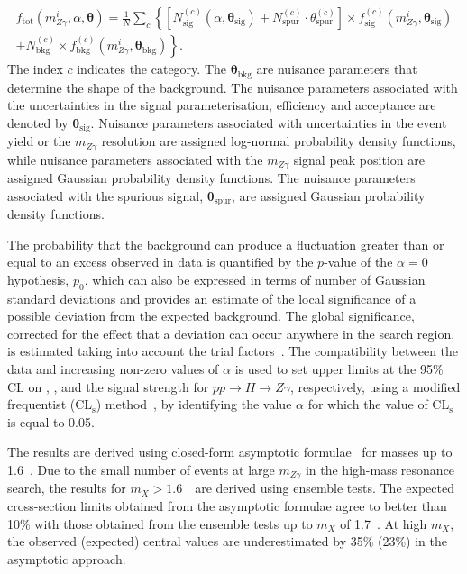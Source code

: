 \begin{multline}
f_\mathrm{tot}(m_{Z\gamma}^i,\alpha,\boldsymbol{\theta}) =
\frac{1}{N} \sum_{c} \left\{ \left[ N_{\mathrm{sig}}^{(c)}(\alpha, \boldsymbol{\theta_\mathrm{sig}}) + N_{\mathrm{spur}}^{(c)} \cdot \theta_{\mathrm{spur}}^{(c)} \right] \times f_{\mathrm{sig}}^{(c)}(m_{Z\gamma}^i,\boldsymbol{\theta_\mathrm{sig}}) \right. \\
\left.  + N_{\mathrm{bkg}}^{(c)} \times f_{\mathrm{bkg}}^{(c)}(m_{Z\gamma}^i,\boldsymbol{\theta_\mathrm{bkg}})\right\}.
\end{multline}
%
The index $c$ indicates the category. The $\boldsymbol{\theta_\mathrm{bkg}}$ are nuisance
parameters that determine the shape of the background.
The nuisance parameters associated with the uncertainties
in the signal parameterisation, efficiency and acceptance are denoted by 
$\boldsymbol{\theta_\mathrm{sig}}$. 
Nuisance parameters associated with uncertainties in the event yield or the
 $m_{Z\gamma}$ resolution are assigned log-normal probability density functions, while nuisance 
parameters
associated with the $m_{Z\gamma}$ signal peak position are assigned Gaussian probability 
density functions.  
The nuisance parameters associated 
with the spurious signal, $\boldsymbol{\theta_\mathrm{spur}}$, are assigned 
Gaussian probability density functions. 

The probability that the background can produce a fluctuation greater than or equal to an
excess observed in data 
is quantified by the $p$-value of the $\alpha = 0$ hypothesis,
$p_{0}$, which can also be expressed in terms of number of Gaussian standard deviations and 
provides an estimate of the local significance of a possible deviation from the expected
background. The global significance, corrected for the effect that a deviation can occur
anywhere in the search region, is estimated taking into account the trial 
factors~\cite{Gross:2010qma}.
The compatibility between the data and increasing
non-zero values of $\alpha$ is used to set upper limits at the 95\% CL on
\sighxbr, \brhzg, and the signal strength for $pp\to H\to Z\gamma$, respectively, 
using a modified frequentist 
(CL$_\mathrm{s}$) method~\cite{cls},
by identifying the value $\alpha$ for which the value of CL$_\mathrm{s}$ is equal to 0.05.

The results are derived using closed-form asymptotic formulae~\cite{stat} for masses up to
1.6~\TeV. Due to
the small number of events at large $m_{Z\gamma}$ in the high-mass resonance search, 
the results for $m_X> 1.6$~\TeV\ are derived using ensemble tests. 
The expected cross-section limits obtained from the
asymptotic formulae agree to better than 10\% with those obtained from the ensemble tests
up to $m_X$ of 1.7~\TeV.
At high $m_X$, the observed (expected) central values are underestimated by 35\% (23\%) in the 
asymptotic approach. 


